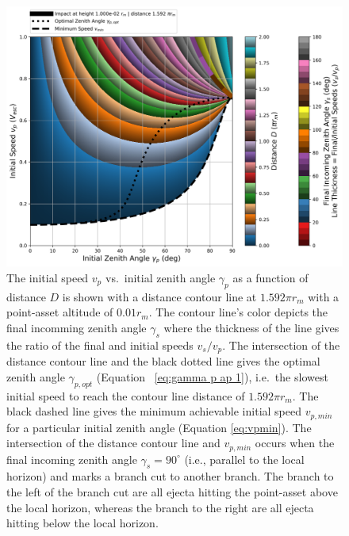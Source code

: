 \documentclass{article}
\begin{document}
\begin{figure}[!htb]
	\centering
	\includegraphics[width=1.0\linewidth]{dist_speed_zenith_plot_013_1.000e-02_5.000.png}
	\caption{The initial speed $v_p$ vs.\ initial zenith angle $\gamma_p$ as a function of distance $D$ is shown with a distance contour line at $1.592\pi r_m$ with a point-asset altitude of $0.01 r_m$. The contour line's color depicts the final incomming zenith angle $\gamma_s$ where the thickness of the line gives the ratio of the final and initial speeds $v_s/v_p$. The intersection of the distance contour line and the black dotted line gives the optimal zenith angle $\gamma_{p,opt}$ (Equation~
		\eqref{eq:gamma p ap 1}), i.e.\ the slowest initial speed to reach the contour line distance of $1.592\pi r_m$. The black dashed line gives the minimum achievable initial speed $v_{p,min}$ for a particular initial zenith angle (Equation \eqref{eq:vpmin}). The intersection of the distance contour line and $v_{p,min}$ occurs when the final incoming zenith angle $\gamma_s = 90^\circ$ (i.e., parallel to the local horizon) and marks a branch cut to another branch. The branch to the left of the branch cut are all ejecta hitting the point-asset above the local horizon, whereas the branch to the right are all ejecta hitting below the local horizon.}\label{fig:dist_speed_zenith_plot_013_1.000e-02_5.000}
\end{figure}


\end{document}
